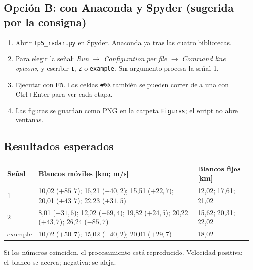 \documentclass[11pt]{article}
\newcommand{\archivo}[1]{\texttt{#1}}
\begin{document}
\subsection{Opción B: con Anaconda y Spyder (sugerida por la consigna)}
\begin{enumerate}
  \item Abrir \archivo{tp5\_radar.py} en Spyder. Anaconda ya trae las cuatro bibliotecas.
  \item Para elegir la señal: \textit{Run} $\rightarrow$ \textit{Configuration per file} $\rightarrow$ \textit{Command line options}, y escribir \archivo{1}, \archivo{2} o \archivo{example}. Sin argumento procesa la señal 1.
  \item Ejecutar con F5. Las celdas \archivo{\#\%\%} también se pueden correr de a una con Ctrl+Enter para ver cada etapa.
  \item Las figuras se guardan como PNG en la carpeta \archivo{Figuras}; el script no abre ventanas.
\end{enumerate}

\subsection{Resultados esperados}
\begin{table}[H]
  \centering
  \small
  \begin{tabular}{l p{7.2cm} l}
    \toprule
    \textbf{Señal} & \textbf{Blancos móviles [km; m/s]} & \textbf{Blancos fijos [km]} \\
    \midrule
    1 & 10,02 ($+85{,}7$); 15,21 ($-40{,}2$); 15,51 ($+22{,}7$); 20,01 ($+43{,}7$); 22,23 ($+31{,}5$) & 12,02; 17,61; 21,02 \\
    2 & 8,01 ($+31{,}5$); 12,02 ($+59{,}4$); 19,82 ($+24{,}5$); 20,22 ($+43{,}7$); 26,24 ($-85{,}7$) & 15,62; 20,31; 22,02 \\
    example & 10,02 ($+50{,}7$); 15,02 ($-40{,}2$); 20,01 ($+29{,}7$) & 18,02 \\
    \bottomrule
  \end{tabular}
\end{table}
Si los números coinciden, el procesamiento está reproducido. Velocidad positiva: el blanco se acerca; negativa: se aleja.
\end{document}
